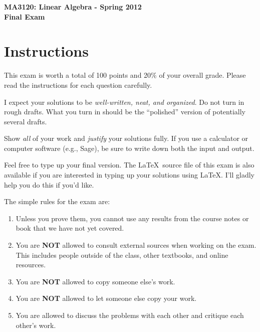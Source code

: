 \documentclass[11pt]{article}
\theoremstyle{definition}
\begin{document}
\begin{center}

{\Large\bf MA3120: Linear Algebra - Spring 2012}\\
\smallskip
{\Large\bf Final Exam}

\bigskip

  
  \bigskip
  

\end{center}

\section*{Instructions}

This exam is worth a total of 100 points and 20\% of your overall grade.  Please read the instructions for each question carefully.

\bigskip

I expect your solutions to be \emph{well-written, neat, and organized}.  Do not turn in rough drafts.  What you turn in should be the ``polished'' version of potentially several drafts.  

\bigskip

Show \emph{all} of your work and \emph{justify} your solutions fully.  If you use a calculator or computer software (e.g., Sage), be sure to write down both the input and output.

\bigskip

Feel free to type up your final version.  The \LaTeX\ source file of this exam is also available if you are interested in typing up your solutions using \LaTeX.  I'll gladly help you do this if you'd like.

\bigskip

The simple rules for the exam are:

\begin{enumerate}
\item Unless you prove them, you cannot use any results from the course notes or book that we have not yet covered.
\item You are \textbf{NOT} allowed to consult external sources when working on the exam.  This includes people outside of the class, other textbooks, and online resources.
\item You are \textbf{NOT} allowed to copy someone else's work.
\item You are \textbf{NOT} allowed to let someone else copy your work.
\item You are allowed to discuss the problems with each other and critique each other's work.
\end{enumerate}
\end{document}
